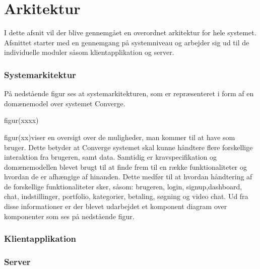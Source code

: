 \chapter{Arkitektur}
I dette afsnit vil der blive gennemgået en overordnet arkitektur for hele systemet. Afsnittet starter med en gennemgang på  systemniveau og arbejder sig ud til de individuelle moduler såsom klientapplikation og server.  

\subsection{Systemarkitektur}
På nedstående figur ses at systemarkitekturen, som er repræsenteret i form af en domænemodel over systemet Converge.

figur(xxxx)

figur(xx)viser en oversigt over de muligheder, man kommer til at have som bruger. Dette betyder at Converge systemet
skal kunne håndtere flere forskellige interaktion fra brugeren, samt data. Samtidig er kravspecifikation og domænemodellen
blevet brugt til at finde frem til en række funktionaliteter og hvordan de er afhængige af hinanden. Dette
medfør til at hvordan håndtering af de forskellige funktionaliteter sker, såsom: brugeren, login, signup,dashboard,
chat, indstillinger, portfolio, kategorier, betaling, søgning og video chat. Ud fra disse informationer er der blevet udarbejdet
et komponent diagram over komponenter som ses på nedstående figur.


\subsection{Klientapplikation}
\subsection{Server}